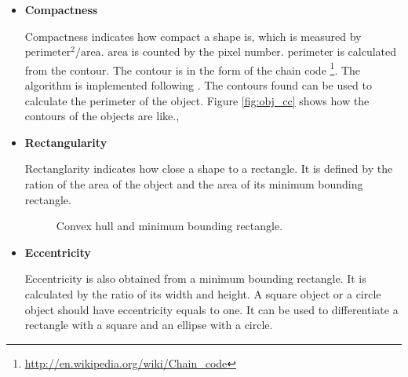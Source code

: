 \documentclass[paper=a4, fontsize=11pt]{scrartcl}
\begin{document}
\begin{itemize}
\item \textbf{Compactness} 

Compactness indicates how compact a shape is, which is measured by $ \mbox{perimeter}^{2} / \mbox{area} $.
$ \mbox{area} $ is counted by the pixel number.
$ \mbox{perimeter} $ is calculated from the contour. 
The contour is in the form of the chain code \footnote{\url{http://en.wikipedia.org/wiki/Chain_code}}. 
The algorithm is implemented following \cite{chaincode}.
The contours found can be used to calculate the perimeter of the object.
Figure \ref{fig:obj_cc} shows how the contours of the objects are like.,

\item \textbf{Rectangularity} 

Rectanglarity indicates how close a shape to a rectangle.
It is defined by the ration of the area of the object and the area of its minimum bounding rectangle.

\begin{figure}[h]
\centering
{} 
\caption{Convex hull and minimum bounding rectangle.}
\label{fig:convex_hull_min_bound_box}
\end{figure}

\item \textbf{Eccentricity}

Eccentricity is also obtained from a minimum bounding rectangle.
It is calculated by the ratio of its width and height.
A square object or a circle object should have eccentricity equals to one.
It can be used to differentiate a rectangle with a square and an ellipse with a circle.


\end{itemize}
\end{document}
